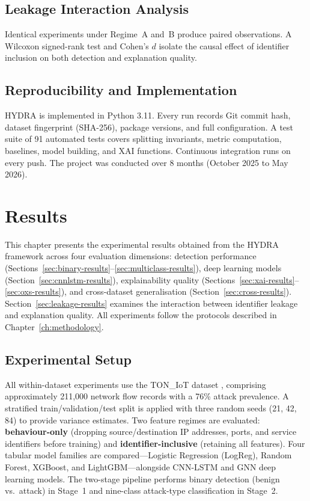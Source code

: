 \documentclass[12pt,a4paper]{report}
\begin{document}
\section{Leakage Interaction Analysis}
\label{sec:leakage-interaction}

Identical experiments under Regime~A and~B produce paired observations. A Wilcoxon signed-rank test and Cohen's $d$ isolate the causal effect of identifier inclusion on both detection and explanation quality.

\section{Reproducibility and Implementation}
\label{sec:implementation}

HYDRA is implemented in Python 3.11. Every run records Git commit hash, dataset fingerprint (SHA-256), package versions, and full configuration. A test suite of 91 automated tests covers splitting invariants, metric computation, baselines, model building, and XAI functions. Continuous integration runs on every push. The project was conducted over 8 months (October 2025 to May 2026).

\chapter{Results}
\label{ch:results}

This chapter presents the experimental results obtained from the HYDRA framework across four evaluation dimensions: detection performance (Sections~\ref{sec:binary-results}--\ref{sec:multiclass-results}), deep learning models (Section~\ref{sec:cnnlstm-results}), explainability quality (Sections~\ref{sec:xai-results}--\ref{sec:oxs-results}), and cross-dataset generalisation (Section~\ref{sec:cross-results}). Section~\ref{sec:leakage-results} examines the interaction between identifier leakage and explanation quality. All experiments follow the protocols described in Chapter~\ref{ch:methodology}.

\section{Experimental Setup}
\label{sec:setup}

All within-dataset experiments use the TON\_IoT dataset \cite{alsaedi2020}, comprising approximately 211,000 network flow records with a 76\% attack prevalence. A stratified train/validation/test split is applied with three random seeds (21, 42, 84) to provide variance estimates. Two feature regimes are evaluated: \textbf{behaviour-only} (dropping source/destination IP addresses, ports, and service identifiers before training) and \textbf{identifier-inclusive} (retaining all features). Four tabular model families are compared---Logistic Regression (LogReg), Random Forest, XGBoost, and LightGBM---alongside CNN-LSTM and GNN deep learning models. The two-stage pipeline performs binary detection (benign vs.\ attack) in Stage~1 and nine-class attack-type classification in Stage~2.
\end{document}
